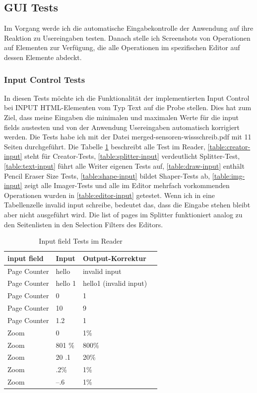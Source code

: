 \subsection{GUI Tests}
Im Vorgang werde ich die automatische Eingabekontrolle der Anwendung auf ihre Reaktion zu Usereingaben testen. Danach stelle ich Screenshots von Operationen auf Elementen zur Verfügung, die alle Operationen im spezifischen Editor auf dessen Elemente abdeckt.

\subsubsection{Input Control Tests}
In diesen Tests möchte ich die Funktionalität der implementierten Input Control bei INPUT HTML-Elementen vom Typ Text auf die Probe stellen. Dies hat zum Ziel, dass meine Eingaben die minimalen und maximalen Werte für die input fields austesten und von der Anwendung Usereingaben automatisch korrigiert werden. Die Tests habe ich mit der Datei merged-sensoren-wissschreib.pdf mit 11 Seiten durchgeführt. Die Tabelle \ref{table:reader-input} beschreibt alle Test im Reader, \ref{table:creator-input} steht für Creator-Tests, \ref{table:splitter-input} verdeutlicht Splitter-Test, \ref{table:text-input} führt alle Writer eigenen Tests auf, \ref{table:draw-input} enthält Pencil Eraser Size Tests, \ref{table:shape-input} bildet Shaper-Tests ab, \ref{table:img-input} zeigt alle Imager-Tests und alle im Editor mehrfach vorkommenden Operationen wurden in \ref{table:editor-input} getestet. Wenn ich in eine Tabellenzelle invalid input schreibe, bedeutet das, dass die Eingabe stehen bleibt aber nicht ausgeführt wird. Die list of pages im Splitter funktioniert analog zu den Seitenlisten in den Selection Filters des Editors.

\begin{table}[!htbp]
	\centering
	\begin{tabular}{|p{4cm}|p{3cm}|p{3cm}|p{3cm}|}
		\hline
		\textbf{input field}				& \textbf{Input} 	& \textbf{Output-Korrektur}	\\ 
		\hline
		Page Counter						& hello 			& invalid input				\\
		Page Counter						& hello 1			& hello1 (invalid input)	\\
		Page Counter						& 0 				& 1							\\ 
		Page Counter						& 10 				& 9 						\\ 
		Page Counter						& 1.2 				& 1 						\\ 
		Zoom 								& 0					& 1\%  						\\
		Zoom 								& 801 \% 			& 800\% 					\\ 
		Zoom 								& 20 .1 			& 20\% 						\\ 
		Zoom 								& .2\% 				& 1\% 					\\ 
		Zoom 								& –.6 				& 1\% 						\\ 
		\hline
	\end{tabular}
	\caption{Input field Tests im Reader}
	\label{table:reader-input}
\end{table}	

